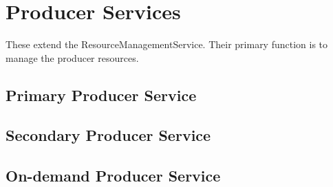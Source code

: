 \section{Producer Services}

These extend the ResourceManagementService. Their primary function is to manage
the  producer resources. 

\subsection{Primary Producer Service}
\label{sec:primaryProducerService}

\subsection{Secondary Producer Service}
\label{sec:secondaryProducerService}

\subsection{On-demand Producer Service}
\label{sec:onDemandProducerService}




